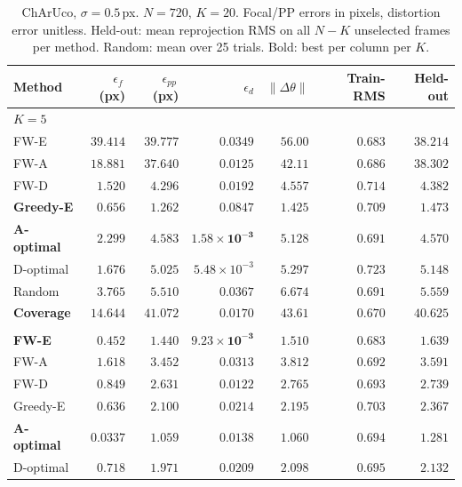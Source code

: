 \documentclass[letterpaper, 9
 pt, conference]{ieeeconf}
\begin{document}
\begin{table}[ht]
\centering
\setlength{\tabcolsep}{4pt}
\caption{ChArUco, $\sigma{=}0.5$\,px. $N{=}720$, $K{=}20$. Focal/PP errors in pixels, distortion error unitless. Held-out: mean reprojection RMS on all $N{-}K$ unselected frames per method. Random: mean over 25 trials. Bold: best per column per $K$.}
\label{tab:ksweep_charuco_sigma05}
\scriptsize
\renewcommand{\arraystretch}{0.80}
\begin{tabular}{lrrrrrr}
\toprule
Method & $\epsilon_f$\,(px) & $\epsilon_{pp}$\,(px) & $\epsilon_d$ & $\|\Delta\theta\|$ & Train-RMS & Held-out \\
\midrule
\multicolumn{7}{l}{\textit{$K{=}5$}} \\[1pt]
FW-E & $39.414$ & $39.777$ & $0.0349$ & $56.00$ & $0.683$ & $38.214$ \\
FW-A & $18.881$ & $37.640$ & $0.0125$ & $42.11$ & $0.686$ & $38.302$ \\
FW-D & $1.520$ & $4.296$ & $0.0192$ & $4.557$ & $0.714$ & $4.382$ \\
\textbf{Greedy-E} & $\mathbf{0.656}$ & $\mathbf{1.262}$ & $0.0847$ & $\mathbf{1.425}$ & $0.709$ & $\mathbf{1.473}$ \\
\textbf{A-optimal} & $2.299$ & $4.583$ & $\mathbf{1.58\!\times\!10^{-3}}$ & $5.128$ & $0.691$ & $4.570$ \\
D-optimal & $1.676$ & $5.025$ & $5.48\!\times\!10^{-3}$ & $5.297$ & $0.723$ & $5.148$ \\
Random & $3.765$ & $5.510$ & $0.0367$ & $6.674$ & $0.691$ & $5.559$ \\
\textbf{Coverage} & $14.644$ & $41.072$ & $0.0170$ & $43.61$ & $\mathbf{0.670}$ & $40.625$ \\
\addlinespace[1pt]
\multicolumn{7}{l}{\textit{$K{=}10$}} \\[1pt]
\textbf{FW-E} & $0.452$ & $1.440$ & $\mathbf{9.23\!\times\!10^{-3}}$ & $1.510$ & $\mathbf{0.683}$ & $1.639$ \\
FW-A & $1.618$ & $3.452$ & $0.0313$ & $3.812$ & $0.692$ & $3.591$ \\
FW-D & $0.849$ & $2.631$ & $0.0122$ & $2.765$ & $0.693$ & $2.739$ \\
Greedy-E & $0.636$ & $2.100$ & $0.0214$ & $2.195$ & $0.703$ & $2.367$ \\
\textbf{A-optimal} & $\mathbf{0.0337}$ & $\mathbf{1.059}$ & $0.0138$ & $\mathbf{1.060}$ & $0.694$ & $\mathbf{1.281}$ \\
D-optimal & $0.718$ & $1.971$ & $0.0209$ & $2.098$ & $0.695$ & $2.132$ \\

\end{tabular}
\end{table}
\end{document}
